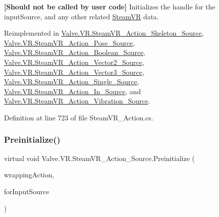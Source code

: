 {\bfseries{\mbox{[}Should not be called by user code\mbox{]}}} Initializes the handle for the input\+Source, and any other related \mbox{\hyperlink{class_valve_1_1_v_r_1_1_steam_v_r}{Steam\+VR}} data. 



Reimplemented in \mbox{\hyperlink{class_valve_1_1_v_r_1_1_steam_v_r___action___skeleton___source_af437a90257ecb494eb2c0b77747fe9d4}{Valve.\+V\+R.\+Steam\+V\+R\+\_\+\+Action\+\_\+\+Skeleton\+\_\+\+Source}}, \mbox{\hyperlink{class_valve_1_1_v_r_1_1_steam_v_r___action___pose___source_ab25a681f8310683a3c6695973041acc0}{Valve.\+V\+R.\+Steam\+V\+R\+\_\+\+Action\+\_\+\+Pose\+\_\+\+Source}}, \mbox{\hyperlink{class_valve_1_1_v_r_1_1_steam_v_r___action___boolean___source_abf7892da581c5adc54514e02df609b4c}{Valve.\+V\+R.\+Steam\+V\+R\+\_\+\+Action\+\_\+\+Boolean\+\_\+\+Source}}, \mbox{\hyperlink{class_valve_1_1_v_r_1_1_steam_v_r___action___vector2___source_a0633b07e1292cf9a235cf51f7cb117e8}{Valve.\+V\+R.\+Steam\+V\+R\+\_\+\+Action\+\_\+\+Vector2\+\_\+\+Source}}, \mbox{\hyperlink{class_valve_1_1_v_r_1_1_steam_v_r___action___vector3___source_a81f16a2652a419128d21fb861cd41112}{Valve.\+V\+R.\+Steam\+V\+R\+\_\+\+Action\+\_\+\+Vector3\+\_\+\+Source}}, \mbox{\hyperlink{class_valve_1_1_v_r_1_1_steam_v_r___action___single___source_a4f9479769ac075b66ff50f2840db44c2}{Valve.\+V\+R.\+Steam\+V\+R\+\_\+\+Action\+\_\+\+Single\+\_\+\+Source}}, \mbox{\hyperlink{class_valve_1_1_v_r_1_1_steam_v_r___action___in___source_a15f00851d0666c0f9f1836bf481f4f70}{Valve.\+V\+R.\+Steam\+V\+R\+\_\+\+Action\+\_\+\+In\+\_\+\+Source}}, and \mbox{\hyperlink{class_valve_1_1_v_r_1_1_steam_v_r___action___vibration___source_afb6813404b87deef9ec2352046d739eb}{Valve.\+V\+R.\+Steam\+V\+R\+\_\+\+Action\+\_\+\+Vibration\+\_\+\+Source}}.



Definition at line 723 of file Steam\+V\+R\+\_\+\+Action.\+cs.

\mbox{\label{class_valve_1_1_v_r_1_1_steam_v_r___action___source_aa2bec7f32b37595de01f1456a3fa5bfe}} 
\subsubsection{\texorpdfstring{Preinitialize()}{Preinitialize()}}
{\footnotesize\ttfamily virtual void Valve.\+V\+R.\+Steam\+V\+R\+\_\+\+Action\+\_\+\+Source.\+Preinitialize (\begin{DoxyParamCaption}\item[{\mbox{\hyperlink{class_valve_1_1_v_r_1_1_steam_v_r___action}{Steam\+V\+R\+\_\+\+Action}}}]{wrapping\+Action,  }\item[{\mbox{\hyperlink{namespace_valve_1_1_v_r_a82e5bf501cc3aa155444ee3f0662853f}{Steam\+V\+R\+\_\+\+Input\+\_\+\+Sources}}}]{for\+Input\+Source }\end{DoxyParamCaption})\hspace{0.3cm}{\ttfamily [virtual]}}



